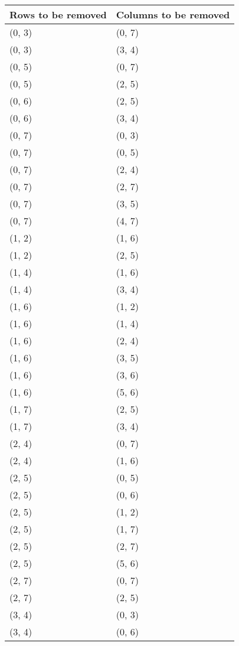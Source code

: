 \begin{footnotesize}
\begin{longtable}[c]{|l|l|}
\hline
\textbf{Rows to be removed} & \textbf{Columns to be removed} \\ \hline
\endfirsthead
\endhead
(0, 3)
&(0, 7)
\\ \hline
(0, 3)
&(3, 4)
\\ \hline
(0, 5)
&(0, 7)
\\ \hline
(0, 5)
&(2, 5)
\\ \hline
(0, 6)
&(2, 5)
\\ \hline
(0, 6)
&(3, 4)
\\ \hline
(0, 7)
&(0, 3)
\\ \hline
(0, 7)
&(0, 5)
\\ \hline
(0, 7)
&(2, 4)
\\ \hline
(0, 7)
&(2, 7)
\\ \hline
(0, 7)
&(3, 5)
\\ \hline
(0, 7)
&(4, 7)
\\ \hline
(1, 2)
&(1, 6)
\\ \hline
(1, 2)
&(2, 5)
\\ \hline
(1, 4)
&(1, 6)
\\ \hline
(1, 4)
&(3, 4)
\\ \hline
(1, 6)
&(1, 2)
\\ \hline
(1, 6)
&(1, 4)
\\ \hline
(1, 6)
&(2, 4)
\\ \hline
(1, 6)
&(3, 5)
\\ \hline
(1, 6)
&(3, 6)
\\ \hline
(1, 6)
&(5, 6)
\\ \hline
(1, 7)
&(2, 5)
\\ \hline
(1, 7)
&(3, 4)
\\ \hline
(2, 4)
&(0, 7)
\\ \hline
(2, 4)
&(1, 6)
\\ \hline
(2, 5)
&(0, 5)
\\ \hline
(2, 5)
&(0, 6)
\\ \hline
(2, 5)
&(1, 2)
\\ \hline
(2, 5)
&(1, 7)
\\ \hline
(2, 5)
&(2, 7)
\\ \hline
(2, 5)
&(5, 6)
\\ \hline
(2, 7)
&(0, 7)
\\ \hline
(2, 7)
&(2, 5)
\\ \hline
(3, 4)
&(0, 3)
\\ \hline
(3, 4)
&(0, 6)
\\ \hline

\end{longtable}
\end{footnotesize}
